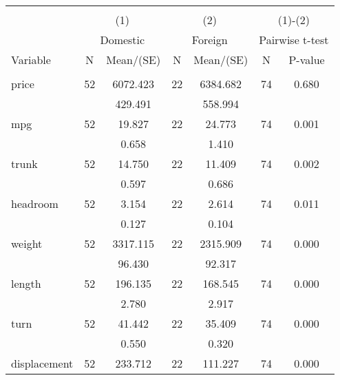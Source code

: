 
\begin{tabular}{@{\extracolsep{5pt}}lcccccc}
\\[-1.8ex]\hline \hline \\[-1.8ex]
 & \multicolumn{2}{c}{(1)}  & \multicolumn{2}{c}{(2)}  & \multicolumn{2}{c}{(1)-(2)} \\
 & \multicolumn{2}{c}{Domestic}  & \multicolumn{2}{c}{Foreign}  & \multicolumn{2}{c}{Pairwise t-test}  \\
Variable & N & Mean/(SE) & N & Mean/(SE) & N & P-value \\ \hline \\[-1.8ex] 
price   & 52    &  6072.423    & 22    &  6384.682    & 74    &     0.680   \\
 &   &   429.491  &   &   558.994  &   &   \\
mpg   & 52    &    19.827    & 22    &    24.773    & 74    &     0.001   \\
 &   &     0.658  &   &     1.410  &   &   \\
trunk   & 52    &    14.750    & 22    &    11.409    & 74    &     0.002   \\
 &   &     0.597  &   &     0.686  &   &   \\
headroom   & 52    &     3.154    & 22    &     2.614    & 74    &     0.011   \\
 &   &     0.127  &   &     0.104  &   &   \\
weight   & 52    &  3317.115    & 22    &  2315.909    & 74    &     0.000   \\
 &   &    96.430  &   &    92.317  &   &   \\
length   & 52    &   196.135    & 22    &   168.545    & 74    &     0.000   \\
 &   &     2.780  &   &     2.917  &   &   \\
turn   & 52    &    41.442    & 22    &    35.409    & 74    &     0.000   \\
 &   &     0.550  &   &     0.320  &   &   \\
displacement   & 52    &   233.712    & 22    &   111.227    & 74    &     0.000   \\

\end{tabular}
